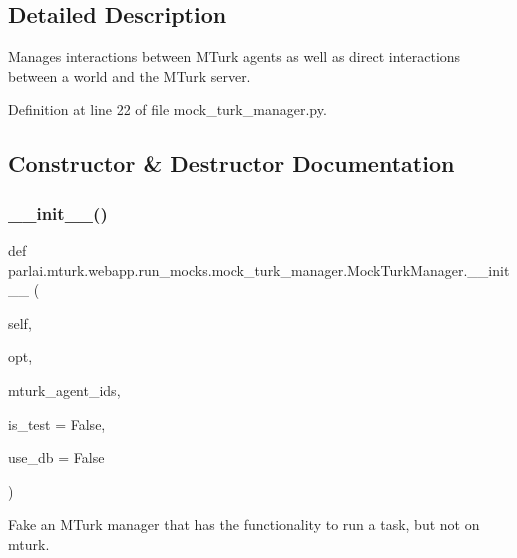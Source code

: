 \subsection{Detailed Description}
\begin{DoxyVerb}Manages interactions between MTurk agents as well as direct interactions between a
world and the MTurk server.
\end{DoxyVerb}
 

Definition at line 22 of file mock\+\_\+turk\+\_\+manager.\+py.



\subsection{Constructor \& Destructor Documentation}
\mbox{\label{classparlai_1_1mturk_1_1webapp_1_1run__mocks_1_1mock__turk__manager_1_1MockTurkManager_ac6c394612ebb458f0ddad07f5325eb3d}} 
\subsubsection{\texorpdfstring{\+\_\+\+\_\+init\+\_\+\+\_\+()}{\_\_init\_\_()}}
{\footnotesize\ttfamily def parlai.\+mturk.\+webapp.\+run\+\_\+mocks.\+mock\+\_\+turk\+\_\+manager.\+Mock\+Turk\+Manager.\+\_\+\+\_\+init\+\_\+\+\_\+ (\begin{DoxyParamCaption}\item[{}]{self,  }\item[{}]{opt,  }\item[{}]{mturk\+\_\+agent\+\_\+ids,  }\item[{}]{is\+\_\+test = {\ttfamily False},  }\item[{}]{use\+\_\+db = {\ttfamily False} }\end{DoxyParamCaption})}

\begin{DoxyVerb}Fake an MTurk manager that has the functionality to run a task, but not on
mturk.
\end{DoxyVerb}
 

